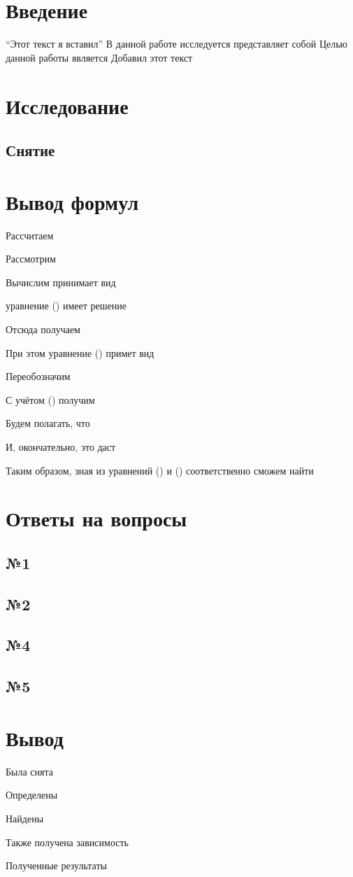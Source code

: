 



\def\labauthors{Понур К.А., Сарафанов Ф.Г., Сидоров Д.А.}
\def\labgroup{420}
\def\labnumber{000}
\def\labtheme{Эффект Холла}



\tableofcontents
\newpage

\section*{Введение}
\label{sec:input}
``Этот текст я вставил''
В данной работе исследуется 
представляет собой
Целью данной работы является 
Добавил этот текст

\newpage
\section{Исследование}
\subsection{Снятие}


\newpage
\section{Вывод формул}
Рассчитаем 

Рассмотрим 

Вычислим
принимает вид

уравнение () имеет решение

Отсюда получаем

При этом уравнение () примет вид

Переобозначим 

С учётом () получим

Будем полагать, что 

И, окончательно, это даст 


Таким образом, зная из уравнений () и () соответственно сможем найти 

\newpage
\section{Ответы на вопросы}

\subsection{№1}
\subsection{№2}
\subsection{№4}
\subsection{№5}


\newpage
\section{Вывод}

Была снята 

Определены 

Найдены 

Также получена зависимость 

Полученные результаты  




